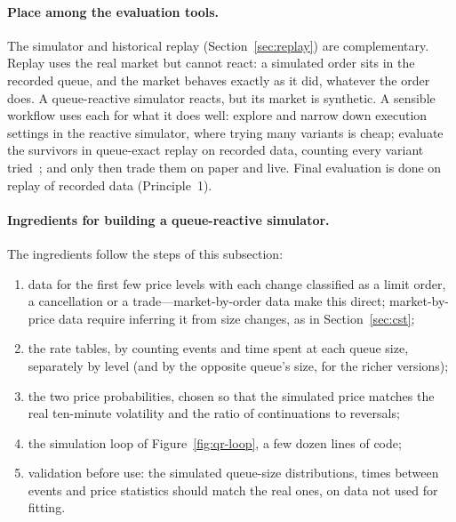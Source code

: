 \paragraph{Place among the evaluation tools.} The simulator and historical replay
(Section~\ref{sec:replay}) are complementary. Replay uses the real market but cannot react: a
simulated order sits in the recorded queue, and the market behaves exactly as it did, whatever the order
does. A queue-reactive simulator reacts, but its market is synthetic. A sensible workflow uses each for what
it does well: explore and narrow down execution settings in the reactive simulator, where trying many
variants is cheap; evaluate the survivors in queue-exact replay on recorded data, counting every variant
tried~\citep{white2000,harvey2016}; and only then trade them on paper and live. Final evaluation is done on replay of recorded data
(Principle~1).

\paragraph{Ingredients for building a queue-reactive simulator.} The ingredients follow the steps of this subsection:
\begin{enumerate}[leftmargin=1.8em,itemsep=1pt]
\item data for the first few price levels with each change classified as a limit order, a cancellation or
  a trade---market-by-order data make this direct; market-by-price data require inferring it from size
  changes, as in Section~\ref{sec:cst};
\item the rate tables, by counting events and time spent at each queue size, separately by level (and by
  the opposite queue's size, for the richer versions);
\item the two price probabilities, chosen so that the simulated price matches the real ten-minute
  volatility and the ratio of continuations to reversals;
\item the simulation loop of Figure~\ref{fig:qr-loop}, a few dozen lines of code;
\item validation before use: the simulated queue-size distributions, times between events and price
  statistics should match the real ones, on data not used for fitting.
\end{enumerate}


